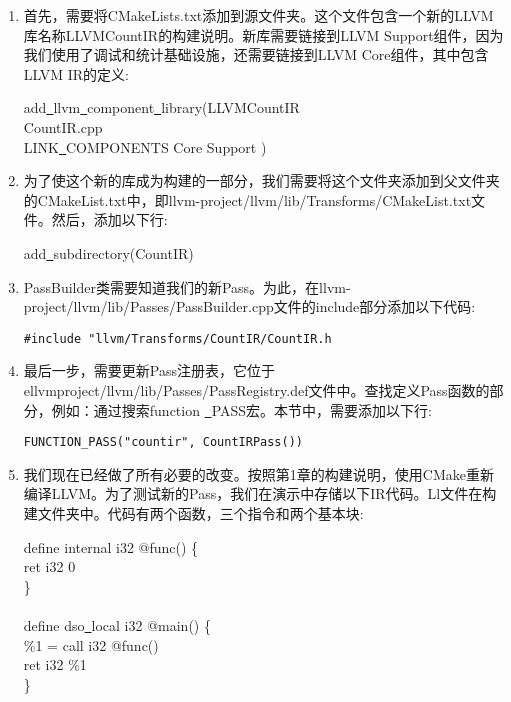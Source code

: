 \begin{enumerate}
\item 首先，需要将CMakeLists.txt添加到源文件夹。这个文件包含一个新的LLVM库名称LLVMCountIR的构建说明。新库需要链接到LLVM Support组件，因为我们使用了调试和统计基础设施，还需要链接到LLVM Core组件，其中包含LLVM IR的定义:
\begin{tcolorbox}[colback=white,colframe=black]
add\underline{~}llvm\underline{~}component\underline{~}library(LLVMCountIR \\
\hspace*{0.5cm}CountIR.cpp \\
\hspace*{0.5cm}LINK\underline{~}COMPONENTS Core Support )
\end{tcolorbox}
	
\item 为了使这个新的库成为构建的一部分，我们需要将这个文件夹添加到父文件夹的CMakeList.txt中，即llvm-project/llvm/lib/Transforms/CMakeList.txt文件。然后，添加以下行:
\begin{tcolorbox}[colback=white,colframe=black]
add\underline{~}subdirectory(CountIR)
\end{tcolorbox}
	
\item PassBuilder类需要知道我们的新Pass。为此，在llvm-project/llvm/lib/Passes/PassBuilder.cpp文件的include部分添加以下代码:
\begin{lstlisting}[caption={}]
#include "llvm/Transforms/CountIR/CountIR.h
\end{lstlisting}
	
\item 最后一步，需要更新Pass注册表，它位于ellvmproject/llvm/lib/Passes/PassRegistry.def文件中。查找定义Pass函数的部分，例如：通过搜索function \underline{~}PASS宏。本节中，需要添加以下行:
\begin{lstlisting}[caption={}]
FUNCTION_PASS("countir", CountIRPass())
\end{lstlisting}
	
\item 我们现在已经做了所有必要的改变。按照第1章的构建说明，使用CMake重新编译LLVM。为了测试新的Pass，我们在演示中存储以下IR代码。Ll文件在构建文件夹中。代码有两个函数，三个指令和两个基本块:
\begin{tcolorbox}[colback=white,colframe=black]
define internal i32 @func() \{ \\
\hspace*{0.5cm}ret i32 0 \\
\} \\
\\
define dso\underline{~}local i32 @main() \{ \\
\hspace*{0.5cm}	\%1 = call i32 @func() \\
\hspace*{0.5cm}	ret i32 \%1 \\
\}
\end{tcolorbox}
	

\end{enumerate}
